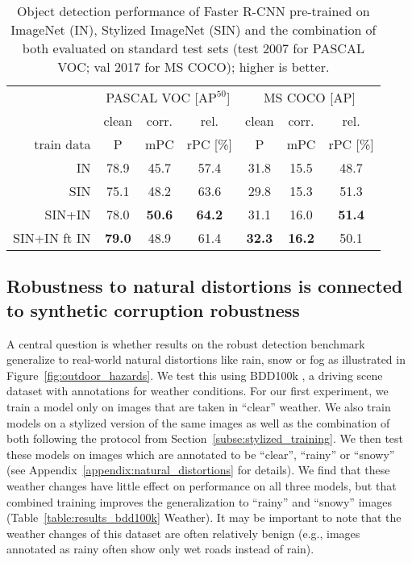 \documentclass{article}
\newcommand{\highlight}[1]{{\cellcolor{gray.220} #1}}
\begin{document}
\begin{table}[t]\footnotesize
\begin{center}
\begin{tabular}{r|ccc|ccc}
\toprule
 &\multicolumn{3}{c|}{PASCAL VOC [$\operatorname{AP^{50}}$]} & \multicolumn{3}{c}{MS COCO [AP]}\\
& clean & \highlight{corr.} & rel. & clean & \highlight{corr.} & rel. \\
train data & P & \highlight{mPC} & rPC [\%] & P & \highlight{mPC} & rPC [\%] \\
\hline
IN & 78.9 & \highlight{45.7} & 57.4 & 31.8 & \highlight{15.5} & 48.7 \\
\hline
SIN & 75.1 & \highlight{48.2} & 63.6 & 29.8 & \highlight{15.3} & 51.3\\
SIN+IN & 78.0 & \highlight{\textbf{50.6}} & \textbf{64.2} & 31.1 & \highlight{16.0} & \textbf{51.4} \\
SIN+IN ft IN & \textbf{79.0} & \highlight{48.9} & 61.4 & \textbf{32.3} & \highlight{\textbf{16.2}} & 50.1 \\
\bottomrule
\end{tabular}
\caption{Object detection performance of Faster R-CNN pre-trained on ImageNet (IN), Stylized ImageNet (SIN) and the combination of both evaluated on standard test sets (test 2007 for PASCAL VOC; val 2017 for MS COCO); higher is better.}
\label{table:results_stylized_pretraining}
\vspace{-0.3cm}
\end{center}
\end{table}



\subsection{Robustness to natural distortions is connected to synthetic corruption robustness}

A central question is whether results on the robust detection benchmark generalize to real-world natural distortions like rain, snow or fog as illustrated in Figure~\ref{fig:outdoor_hazards}. We test this using BDD100k \citep{yu2018bdd100k}, a driving scene dataset with annotations for weather conditions. For our first experiment, we train a model only on images that are taken in ``clear'' weather. We also train models on a stylized version of the same images as well as the combination of both following the protocol from Section~\ref{subse:stylized_training}. We then test these models on images which are annotated to be ``clear'', ``rainy'' or ``snowy'' (see Appendix~\ref{appendix:natural_distortions} for details). We find that these weather changes have little effect on performance on all three models, but that combined training improves the generalization to ``rainy'' and ``snowy'' images (Table~\ref{table:results_bdd100k} Weather). It may be important to note that the weather changes of this dataset are often relatively benign (e.g., images annotated as rainy often show only wet roads instead of rain). 
\end{document}
